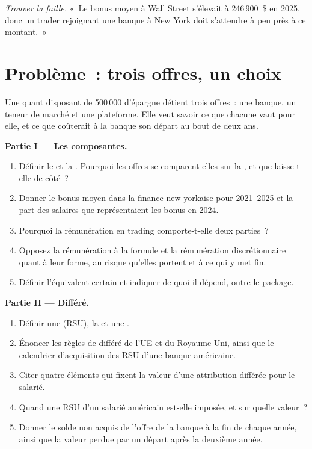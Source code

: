 \begin{exercise}[$\star\star\star$]\label{exo:in:how-pay-works:8}
\emph{Trouver la faille.} «~Le bonus moyen à Wall Street s'élevait à 246\,900~\$ en 2025, donc un trader rejoignant une banque à New York
doit s'attendre à peu près à ce montant.~»
\end{exercise}

\section{Problème~: trois offres, un choix}

\begin{problem}\label{pb:in:how-pay-works:1}
Une quant disposant de 500\,000 d'épargne détient trois offres~: une banque, un teneur de marché et une plateforme. Elle veut savoir ce que
chacune vaut pour elle, et ce que coûterait à la banque son départ au bout de deux ans.

\medskip\noindent\textbf{Partie I --- Les composantes.}
\begin{enumerate}
\item Définir le  et la . Pourquoi les offres se comparent-elles sur la , et que laisse-t-elle de côté~?
\item Donner le bonus moyen dans la finance new-yorkaise pour 2021--2025 et la part des salaires que représentaient les bonus en 2024.
\item Pourquoi la rémunération en trading comporte-t-elle deux parties~?
\item Opposez la rémunération à la formule et la rémunération discrétionnaire quant à leur forme, au risque qu'elles portent et à ce qui y met fin.
\item Définir l'équivalent certain et indiquer de quoi il dépend, outre le package.
\end{enumerate}

\medskip\noindent\textbf{Partie II --- Différé.}
\begin{enumerate}[resume]
\item Définir une  (RSU), la  et une .
\item Énoncer les règles de différé de l'UE et du Royaume-Uni, ainsi que le calendrier d'acquisition des RSU d'une banque américaine.
\item Citer quatre éléments qui fixent la valeur d'une attribution différée pour le salarié.
\item Quand une RSU d'un salarié américain est-elle imposée, et sur quelle valeur~?
\item Donner le solde non acquis de l'offre de la banque à la fin de chaque année, ainsi que la valeur perdue par un départ après la deuxième année.
\end{enumerate}


\end{problem}

